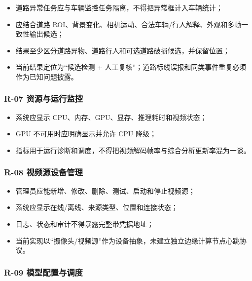 \begin{itemize}
\tightlist
\item
  道路异常任务应与车辆监控任务隔离，不得把异常框计入车辆统计；
\item
  应结合道路 ROI、背景变化、相机运动、合法车辆/行人解释、外观和多帧一致性输出候选；
\item
  结果至少区分道路异物、道路行人和可选道路破损候选，并保留位置；
\item
  当前结果定位为``候选检测 + 人工复核''；道路标线误报和同类事件重复必须作为已知问题披露。
\end{itemize}

\subsubsection{R-07 资源与运行监控}\label{requirements-r-07-ux8d44ux6e90ux4e0eux8fd0ux884cux76d1ux63a7}

\begin{itemize}
\tightlist
\item
  系统应显示 CPU、内存、GPU、显存、推理耗时和视频状态；
\item
  GPU 不可用时应明确显示并允许 CPU 降级；
\item
  指标用于运行诊断和调度，不得把视频解码帧率与综合分析更新率混为一谈。
\end{itemize}

\subsubsection{R-08 视频源设备管理}\label{requirements-r-08-ux89c6ux9891ux6e90ux8bbeux5907ux7ba1ux7406}

\begin{itemize}
\tightlist
\item
  管理员应能新增、修改、删除、测试、启动和停止视频源；
\item
  系统应显示在线/离线、来源类型、位置和连接状态；
\item
  日志、状态和审计不得暴露完整带凭据地址；
\item
  当前实现以``摄像头/视频源''作为设备抽象，未建立独立边缘计算节点心跳协议。
\end{itemize}

\subsubsection{R-09 模型配置与调度}\label{requirements-r-09-ux6a21ux578bux914dux7f6eux4e0eux8c03ux5ea6}

